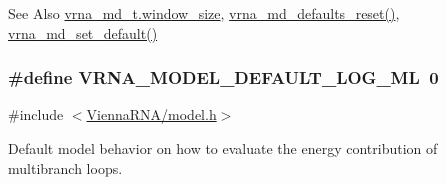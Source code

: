 \begin{DoxySeeAlso}{See Also}
\hyperlink{group__model__details_abea42f9229f8d8d6bcbedef316315bfc}{vrna\-\_\-md\-\_\-t.\-window\-\_\-size}, \hyperlink{group__model__details_ga70834424cf804d149937de89f80ceb45}{vrna\-\_\-md\-\_\-defaults\-\_\-reset()}, \hyperlink{group__model__details_ga8ac6ff84936282436f822644bf841f66}{vrna\-\_\-md\-\_\-set\-\_\-default()} 
\end{DoxySeeAlso}
\hypertarget{group__model__details_ga938f68463e84fe060aa6502f428a517d}{
\subsubsection[{V\-R\-N\-A\-\_\-\-M\-O\-D\-E\-L\-\_\-\-D\-E\-F\-A\-U\-L\-T\-\_\-\-L\-O\-G\-\_\-\-M\-L}]{\setlength{\rightskip}{0pt plus 5cm}\#define V\-R\-N\-A\-\_\-\-M\-O\-D\-E\-L\-\_\-\-D\-E\-F\-A\-U\-L\-T\-\_\-\-L\-O\-G\-\_\-\-M\-L~0}}\label{group__model__details_ga938f68463e84fe060aa6502f428a517d}


{\ttfamily \#include $<$\hyperlink{model_8h}{Vienna\-R\-N\-A/model.\-h}$>$}



Default model behavior on how to evaluate the energy contribution of multibranch loops. 


